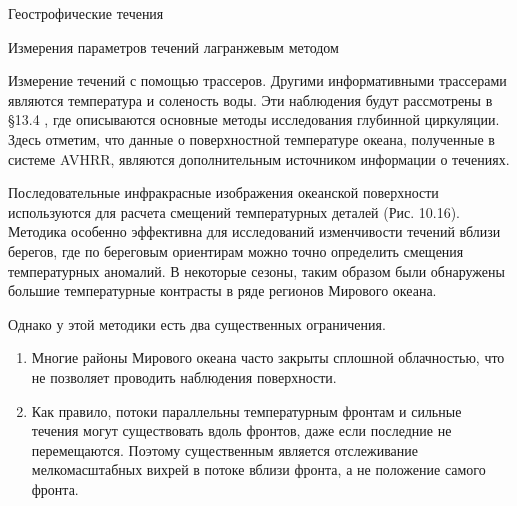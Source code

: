 \begin{chapter}{Геострофические течения}
\begin{section}{Измерения параметров течений лагранжевым методом}
\begin{paragraph}{Измерение течений с помощью трассеров.}
Другими информативными трассерами являются температура и соленость
воды. Эти наблюдения будут рассмотрены в \S13.4 , где описываются
основные методы исследования глубинной циркуляции. Здесь отметим, что
данные о поверхностной температуре океана, полученные в системе AVHRR,
являются дополнительным источником информации о течениях.
%

Последовательные инфракрасные изображения океанской поверхности
используются для расчета смещений температурных деталей
(Рис. 10.16). Методика особенно эффективна для исследований
изменчивости течений вблизи берегов, где по береговым ориентирам можно
точно определить смещения температурных аномалий. В некоторые сезоны,
таким образом были обнаружены большие температурные контрасты в ряде
регионов Мирового океана.
%

Однако у этой методики есть два существенных ограничения.
%
\begin{enumerate}
\item
Многие районы Мирового океана часто закрыты сплошной облачностью, что
не позволяет проводить наблюдения поверхности.
%

\item
Как правило, потоки параллельны температурным фронтам и сильные
течения могут существовать вдоль фронтов, даже если последние не
перемещаются. Поэтому существенным является отслеживание
мелкомасштабных вихрей в потоке вблизи фронта, а не положение самого
фронта.
%
\end{enumerate}
\end{paragraph}


\end{section}
\end{chapter}
